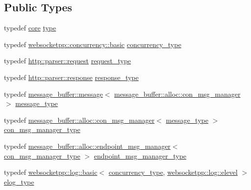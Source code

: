 \subsection*{Public Types}
\begin{DoxyCompactItemize}
\item 
typedef \hyperlink{structwebsocketpp_1_1config_1_1core}{core} \hyperlink{structwebsocketpp_1_1config_1_1core_a889847e774c23625d729b6668d4d0ec8}{type}
\item 
typedef \hyperlink{classwebsocketpp_1_1concurrency_1_1basic}{websocketpp\+::concurrency\+::basic} \hyperlink{structwebsocketpp_1_1config_1_1core_a894e9dea6f10e890ea21a687607c2f70}{concurrency\+\_\+type}
\item 
typedef \hyperlink{classwebsocketpp_1_1http_1_1parser_1_1request}{http\+::parser\+::request} \hyperlink{structwebsocketpp_1_1config_1_1core_a6b17eee7cb81f247afc8f3d7b3a3fc9e}{request\+\_\+type}
\item 
typedef \hyperlink{classwebsocketpp_1_1http_1_1parser_1_1response}{http\+::parser\+::response} \hyperlink{structwebsocketpp_1_1config_1_1core_a08e9a1d498f9002cbabcb1102df6005b}{response\+\_\+type}
\item 
typedef \hyperlink{classwebsocketpp_1_1message__buffer_1_1message}{message\+\_\+buffer\+::message}$<$ \hyperlink{classwebsocketpp_1_1message__buffer_1_1alloc_1_1con__msg__manager}{message\+\_\+buffer\+::alloc\+::con\+\_\+msg\+\_\+manager} $>$ \hyperlink{structwebsocketpp_1_1config_1_1core_afb4c134e0a311beebe31a50458855279}{message\+\_\+type}
\item 
typedef \hyperlink{classwebsocketpp_1_1message__buffer_1_1alloc_1_1con__msg__manager}{message\+\_\+buffer\+::alloc\+::con\+\_\+msg\+\_\+manager}$<$ \hyperlink{structwebsocketpp_1_1config_1_1core_afb4c134e0a311beebe31a50458855279}{message\+\_\+type} $>$ \hyperlink{structwebsocketpp_1_1config_1_1core_a9f19abdae7b74d1595b410ea47f3e0d8}{con\+\_\+msg\+\_\+manager\+\_\+type}
\item 
typedef \hyperlink{classwebsocketpp_1_1message__buffer_1_1alloc_1_1endpoint__msg__manager}{message\+\_\+buffer\+::alloc\+::endpoint\+\_\+msg\+\_\+manager}$<$ \hyperlink{structwebsocketpp_1_1config_1_1core_a9f19abdae7b74d1595b410ea47f3e0d8}{con\+\_\+msg\+\_\+manager\+\_\+type} $>$ \hyperlink{structwebsocketpp_1_1config_1_1core_ac2a5caeef488e2f177bb8f92a37d2f34}{endpoint\+\_\+msg\+\_\+manager\+\_\+type}
\item 
typedef \hyperlink{classwebsocketpp_1_1log_1_1basic}{websocketpp\+::log\+::basic}$<$ \hyperlink{structwebsocketpp_1_1config_1_1core_a894e9dea6f10e890ea21a687607c2f70}{concurrency\+\_\+type}, \hyperlink{structwebsocketpp_1_1log_1_1elevel}{websocketpp\+::log\+::elevel} $>$ \hyperlink{structwebsocketpp_1_1config_1_1core_ac037ffb73b675a6251f3b86433b4eb17}{elog\+\_\+type}

\end{DoxyCompactItemize}
